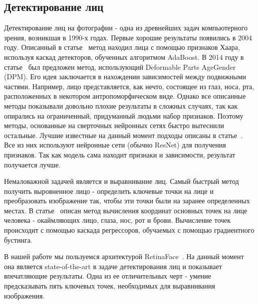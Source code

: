 \subsection{Детектирование лиц}\label{subsec:детектирование-лиц}
Детектирование лиц на фотографии - одна из древнейших задач компьютерного зрения, возникшая в 1990-х годах.
Первые хорошие результаты появились в 2004 году.
Описанный в статье~\cite{face_detection} метод находил лица с помощью признаков Хаара, используя каскад детекторов, обученных алгоритмом AdaBoost.
В 2014 году в статье~\cite{face_detection2} был предложен метод, использующий Deformable Parts AgeGender (DPM).
Его идея заключается в нахождении зависимостей между подвижными частями.
Например, лицо представляется, как нечто, состоящее из глаз, носа, рта, расположенных в некотором антропоморфическом виде.
Однако все описанные методы показывали довольно плохие результаты в сложных случаях, так как опирались на ограниченный, придуманный людьми набор признаков.
Поэтому методы, основанные на сверточных нейронных сетях быстро вытеснили остальные.
Лучшие известные на данный момент подходы описаны в статье~\cite{face_detection3}.
Все из них используют нейронные сети (обычно ResNet) для получения признаков.
Так как модель сама находит признаки и зависимости, результат получается лучше.
\par Немаловажной задачей является и выравнивание лиц.
Самый быстрый метод получить выровненное лицо - определить ключевые точки на лице и преобразовать изображение так, чтобы эти точки были на заранее определенных местах.
В статье~\cite{align} описан метод вычисления координат основных точек на лице человека - окаймляющих лицо, глаза, нос, рот и брови.
Вычисление точек происходит с помощью каскада регрессоров, обучаемых с помощью градиентного бустинга.
\par В нашей работе мы пользуемся архитектурой RetinaFace~\cite{retinaface}.
На данный момент она является state-of-the-art в задаче детектирования лиц и показывает впечатляющие результаты.
Одна из ее отличительных черт - умение предсказывать пять ключевых точек, необходимых для выравнивания изображения.

